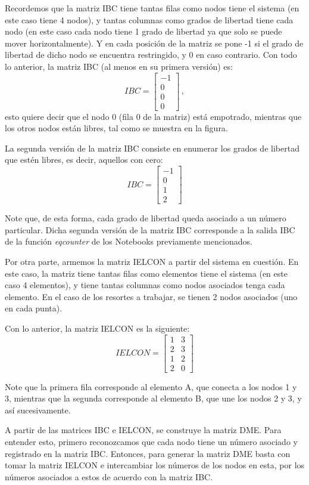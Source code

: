 Recordemos que la matriz IBC tiene tantas filas como nodos tiene el sistema (en 
este caso tiene 4 nodos), y tantas columnas como grados de libertad tiene cada 
nodo (en este caso cada nodo tiene 1 grado de libertad ya que solo se puede 
mover horizontalmente). Y en cada posición de la matriz se pone -1 si el grado 
de libertad de dicho nodo se encuentra restringido, y 0 en caso contrario. Con 
todo lo anterior, la matriz IBC (al menos en su primera versión) es:
$$IBC = 
\begin{bmatrix}
-1 \\ 
0 \\
0 \\
0
\end{bmatrix}\, ,
$$
esto quiere decir que el nodo 0 (fila 0 de la matriz) está empotrado, 
mientras que los otros nodos están libres, tal como se muestra en la figura.

La segunda versión de la matriz IBC consiste en enumerar los grados de libertad 
que estén libres, es decir, aquellos con cero:
$$IBC = 
\begin{bmatrix}
-1 \\
0 \\
1 \\
2
\end{bmatrix}
$$

Note que, de esta forma, cada grado de libertad queda asociado a un número 
particular. Dicha segunda versión de la matriz IBC corresponde a la salida IBC 
de la función \textit{eqcounter} de los Notebooks previamente mencionados.

Por otra parte, armemos la matriz IELCON a partir del sistema en cuestión. En 
este caso, la matriz tiene tantas filas como elementos tiene el sistema (en 
este caso 4 elementos), y tiene tantas columnas como nodos asociados tenga cada 
elemento. En el caso de los resortes a trabajar, se tienen 2 nodos asociados 
(uno en cada punta).

Con lo anterior, la matriz IELCON es la siguiente:
$$IELCON = 
\begin{bmatrix}
1 & 3 \\
2 & 3 \\
1 & 2 \\
2 & 0 
\end{bmatrix}
$$

Note que la primera fila corresponde al elemento A, que conecta a los nodos 1 y 
3, mientras que la segunda corresponde al elemento B, que une los nodos 2 y 3, 
y así sucesivamente.

A partir de las matrices IBC e IELCON, se construye la matriz DME. Para 
entender esto, primero reconozcamos que cada nodo tiene un número asociado y 
registrado en la matriz IBC. Entonces, para generar la matriz DME basta con 
tomar la matriz IELCON e intercambiar los números de los nodos en esta, por los 
números asociados a estos de acuerdo con la matriz IBC. 

